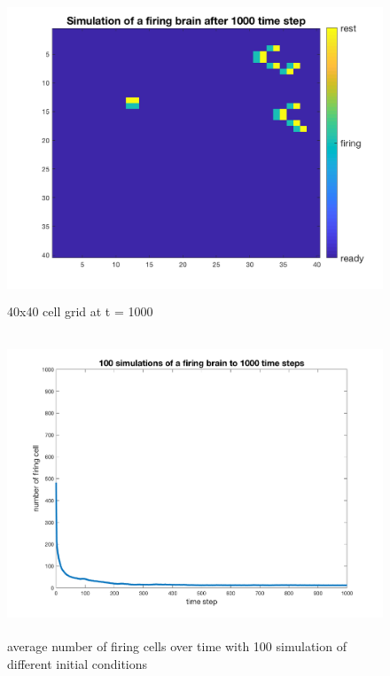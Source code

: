 \documentclass[12pt]{article}
\begin{document}
\begin{figure}[H] %
\centering
\includegraphics[width = 12 cm, height = 9cm]{fire1000.png}
\caption{40x40 cell grid at t = 1000}
\label{fig:fire1000}
\end{figure}

\begin{figure}[H] %
\centering
\includegraphics[width = 12 cm, height = 9cm]{firebrain100sim.png}
\caption{average number of firing cells over time with 100 simulation of different initial conditions}
\label{fig:100sim}
\end{figure}
\end{document}
